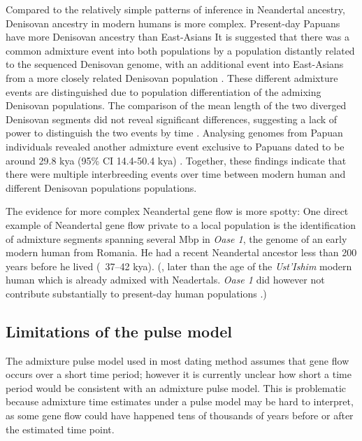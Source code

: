 \documentclass[]{article}
\begin{document}
Compared to the relatively simple patterns of inference in Neandertal ancestry, Denisovan ancestry in modern humans is more complex. Present-day Papuans have more  Denisovan  ancestry than East-Asians \citep{reich_genetic_2010,meyer_high-coverage_2012}
It is suggested that there was a common admixture event into both populations by a population distantly related to the sequenced Denisovan genome, with an additional event into East-Asians from a more closely related Denisovan population \citep{browning_analysis_2018}. These different admixture events are distinguished due to population differentiation of the admixing Denisovan populations. The comparison of the mean length of the two diverged Denisovan segments did not reveal significant differences, suggesting a lack of power to distinguish the two events by time \citep{browning_analysis_2018}. Analysing genomes from Papuan individuals revealed another admixture event exclusive to Papuans dated to be around 29.8 kya (95\% CI 14.4-50.4 kya) \citep{jacobs_multiple_2019}. Together, these findings indicate that there were multiple interbreeding events over time between modern human and different Denisovan populations populations.

 


The evidence for more complex Neandertal gene flow is more spotty: One direct example of  Neandertal gene flow private to a local population is the identification of admixture segments spanning several Mbp in \textit{Oase 1}, the genome of an early modern human from Romania. He had a recent Neandertal ancestor less than 200 years before he lived (~37–42 kya). (, later than the age of the \textit{Ust'Ishim} modern human which is already admixed with Neadertals. \textit{Oase 1} did however not contribute substantially to present-day human populations  \citep{fu_genome_2014,fu_early_2015}.)


\subsection{Limitations of the pulse model}\label{Why can't we us the pulse model}

The admixture pulse model used in most dating method assumes that gene flow occurs over a short time period; however it is currently unclear how short a time period would be consistent with an admixture pulse model. This is problematic because admixture time estimates under a pulse model may be hard to interpret, as some gene flow could have happened tens of thousands of years before or after the estimated time point.
\end{document}
